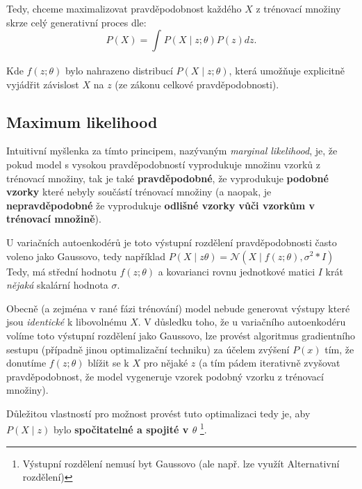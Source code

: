 Tedy, chceme maximalizovat pravděpodobnost každého $X$ z trénovací množiny skrze celý generativní proces dle:
\begin{equation}\label{eq:maximum_likelihood}
    P(X) = \int_{}^{} P(X\mid z;\theta)P(z)dz.
\end{equation}

Kde $f(z;\theta)$ bylo nahrazeno distribucí $P(X\mid z;\theta)$, která umožňuje explicitně vyjádřit závislost $X$ na $z$ (ze zákonu celkové pravděpodobnosti). \cite{Doersch2021}

\subsection{Maximum likelihood}
Intuitivní myšlenka za tímto principem, nazývaným \emph{marginal likelihood}, je, že pokud model s vysokou pravděpodobností vyprodukuje množinu vzorků z trénovací množiny, tak je také \textbf{pravděpodobné}, že vyprodukuje \textbf{podobné vzorky} které nebyly součástí trénovací množiny (a naopak, je  \textbf{nepravděpodobné} že vyprodukuje \textbf{odlišné vzorky vůči vzorkům v trénovací množině}). \cite{Doersch2021}

U variačních autoenkodérů je toto výstupní rozdělení pravděpodobnosti často voleno jako Gaussovo, tedy například $P(X\mid z\theta) = \mathcal{N}(X\mid f(z;\theta), \sigma^2 * I)$
Tedy, má střední hodnotu $f(z;\theta)$ a kovarianci rovnu jednotkové matici $I$ krát \emph{nějaká} skalární hodnota $\sigma$. \cite{Doersch2021}

Obecně (a zejména v rané fázi trénování) model nebude generovat výstupy které jsou \emph{identické} k libovolnému $X$.
V důsledku toho, že u variačního autoenkodéru volíme toto výstupní rozdělení jako Gaussovo, lze provést algoritmus gradientního sestupu (případně jinou optimalizační techniku) za účelem zvýšení $P(x)$ tím, že donutíme $f(z;\theta)$ blížit se k $X$ pro nějaké $z$ (a tím pádem iterativně zvyšovat pravděpodobnost, že model vygeneruje vzorek podobný vzorku z trénovací množiny). \cite{Doersch2021}

Důležitou vlastností pro možnost provést tuto optimalizaci tedy je, aby $P(X \mid z)$ bylo \textbf{spočitatelné a spojité v $\theta$} \footnote{Výstupní rozdělení nemusí byt Gaussovo (ale např. lze využít Alternativní rozdělení)}. \cite{Doersch2021}